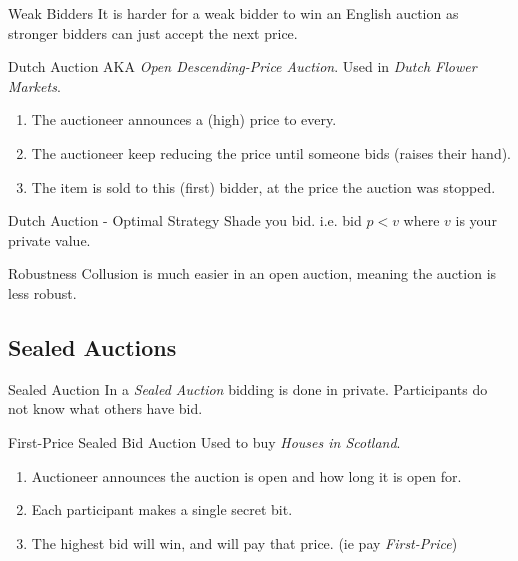 \documentclass[11pt,a4paper]{article}
\begin{document}
\begin{remark}{Weak Bidders}
  It is harder for a weak bidder to win an English auction as stronger bidders can just accept the next price.
\end{remark}

\begin{definition}{Dutch Auction}
  AKA \textit{Open Descending-Price Auction}. Used in \textit{Dutch Flower Markets}.
  \begin{enumerate}
    \item The auctioneer announces a (high) price to every.
    \item The auctioneer keep reducing the price until someone bids (raises their hand).
    \item The item is sold to this (first) bidder, at the price the auction was stopped.
  \end{enumerate}
\end{definition}

\begin{proposition}{Dutch Auction - Optimal Strategy}
  Shade you bid. i.e. bid $p<v$ where $v$ is your private value.
\end{proposition}

\begin{remark}{Robustness}
  Collusion is much easier in an open auction, meaning the auction is less robust.
\end{remark}

\subsection{Sealed Auctions}

\begin{definition}{Sealed Auction}
  In a \textit{Sealed Auction} bidding is done in private. Participants do not know what others have bid.
\end{definition}

\begin{definition}{First-Price Sealed Bid Auction}
  Used to buy \textit{Houses in Scotland}.
  \begin{enumerate}
    \item Auctioneer announces the auction is open and how long it is open for.
    \item Each participant makes a single secret bit.
    \item The highest bid will win, and will pay that price. (ie pay \textit{First-Price})
  \end{enumerate}
\end{definition}
\end{document}
